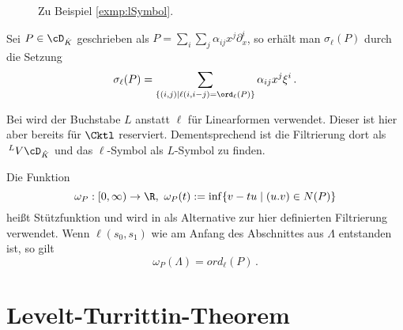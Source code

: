 \begin{bsp}
\begin{figure}[H]
\begin{minipage}[hbt]{0,32\textwidth}
\begin{center}
    \end{center}
  \end{minipage}
  \begin{minipage}[hbt]{0,32\textwidth}
    \begin{center}
    \end{center}
  \end{minipage}
  \caption{Zu Beispiel \ref{exmp:lSymbol}.}
  \label{fig:lSymbol}
\end{figure}
\end{bsp}
\begin{bem}
Sei $P\in \cD_{\hat K}$ geschrieben als
$P=\sum_i\sum_j\alpha_{ij}x^j\partial_x^i$, so erhält man $\sigma_\ell(P)$
durch die Setzung
\[
\sigma_\ell(P)=\sum_{\{(i,j)\mid\ell(i,i-j)=\ord_\ell(P)\}}\alpha_{ij}x^j\xi^i \,.
\]
\end{bem}

\begin{bem}
Bei \cite{sabbah_cimpa90} wird der Buchstabe $L$ anstatt $\ell$ für
Linearformen verwendet. Dieser ist hier aber bereits für $\Cktl$ reserviert.
Dementsprechend ist die Filtrierung dort als $\,^L V\cD_{\hat K}$ und das
$\ell$-Symbol als $L$-Symbol zu finden.
\end{bem}
\begin{bem}[Stützfunktion]
Die Funktion
\[
\omega_P:[0,\infty)\rightarrow\R,~\omega_P(t):=\inf\{v-tu \mid (u.v) \in N(P)\}
\]
heißt Stützfunktion und wird in \cite{ZulaBarbara} als Alternative zur hier
definierten Filtrierung verwendet.
Wenn $\ell(s_0,s_1)$ wie am Anfang des Abschnittes aus $\Lambda$ entstanden
ist, so gilt
\[
\omega_P(\Lambda)=ord_\ell(P) \,.
\]
\end{bem}

\section{Levelt-\!Turrittin-\!Theorem}
\begin{comment}
Das Levelt-Turrittin-Theorem ist ein Satz, der hilft, meromorphe Zusammenhänge
in ihre irreduziblen Komponenten zu zerlegen.
\end{comment}


